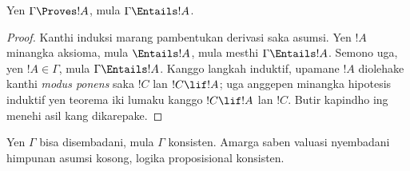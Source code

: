\documentclass[../../../include/open-logic-section]{subfiles}
\begin{document}


\begin{thm}[Kasahihan]
Yen $\Gamma\Proves!A$, mula $\Gamma \Entails !A$.
\end{thm}

\begin{proof}
Kanthi induksi marang pambentukan derivasi saka asumsi. Yen $!A$ minangka aksioma,
mula $\Entails !A$, mula mesthi $\Gamma \Entails!A$.
Semono uga, yen $!A \in \Gamma$, mula $\Gamma \Entails!A$.
Kanggo langkah induktif, upamane $!A$ diolehake kanthi \emph{modus ponens}
saka $!C$ lan $!C\lif!A$; uga anggepen minangka hipotesis induktif
yen teorema iki lumaku kanggo $!C\lif !A$ lan $!C$.
Butir kapindho ing  menehi asil kang dikarepake.
\end{proof}

\begin{cor}
Yen $\Gamma$ bisa disembadani, mula $\Gamma$ konsisten.
Amarga saben valuasi nyembadani himpunan asumsi kosong,
logika proposisional konsisten.
\end{cor}
\end{document}
